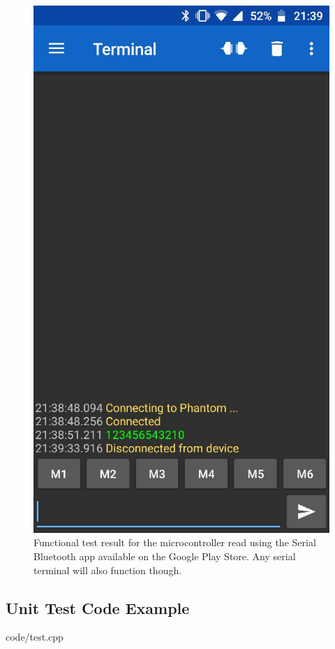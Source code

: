 \documentclass[12pt]{article}
\begin{document}
\begin{figure}[H]
    \centering
    \includegraphics[scale=0.5]{images/functional}
    \caption{Functional test result for the microcontroller read using the Serial Bluetooth app available on the Google Play Store. Any serial terminal will also function though.}
    \label{fig:functional}
\end{figure}

\subsection{Unit Test Code Example}

{code/test.cpp}
\end{document}
